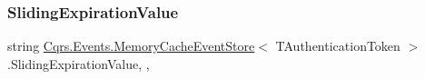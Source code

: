\subsubsection{\texorpdfstring{Sliding\+Expiration\+Value}{SlidingExpirationValue}}
{\footnotesize\ttfamily string \hyperlink{classCqrs_1_1Events_1_1MemoryCacheEventStore}{Cqrs.\+Events.\+Memory\+Cache\+Event\+Store}$<$ T\+Authentication\+Token $>$.Sliding\+Expiration\+Value\hspace{0.3cm}{\ttfamily [get]}, {\ttfamily [set]}, {\ttfamily [protected]}}


